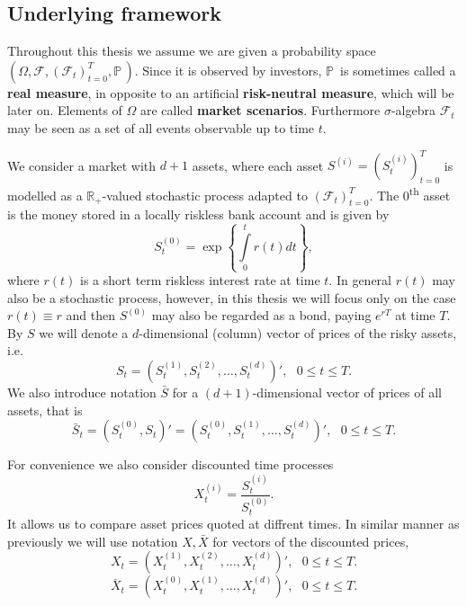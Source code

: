 \documentclass[a4paper,11pt, twoside]{book}
\theoremstyle{definition}
\theoremstyle{remark}
\def\P{{\mathbb{P}}\,}
\def\R{{\mathbb{R}}}
\def\Sa{\bar{S}}
\def\Xa{\bar{X}}
\begin{document}
\subsection{Underlying framework}
Throughout this thesis we assume we are given a probability space $(\Omega, \mathcal{F}, (\mathcal{F}_t)_{t=0}^T, \P)$. Since it is observed by investors, $\P$ is sometimes called a \textbf{real measure}, in opposite to an artificial \textbf{risk-neutral measure}, which will be later on. Elements of $\Omega$ are called \textbf{market scenarios}.
Furthermore $\sigma$-algebra $\mathcal{F}_t$ may be seen as a set of all events observable up to time $t$.

We consider a market with $d+1$ assets, where each asset $S^{(i)} = (S^{(i)}_t)_{t=0}^T$ is modelled as a $\R_+$-valued stochastic process adapted to $(\mathcal{F}_t)_{t=0}^T$. The $0$\textsuperscript{th} asset is the money stored in a locally riskless bank account and is given by 
\[S^{(0)}_t = \exp\left\{ \int\limits_0^t r(t)dt \right\},\]
where $r(t)$ is a short term riskless interest rate at time $t$. In general $r(t)$ may also be a stochastic process, however, in this thesis we will focus only on the case $r(t) \equiv r$ and then $S^{(0)}$ may also be regarded as a bond, paying $e^{rT}$ at time $T$. By $S$ we will denote a $d$-dimensional (column) vector of prices of the risky assets, i.e.
\begin{equation*}
 S_t = (S^{(1)}_t, S^{(2)}_t, \ldots, S^{(d)}_t)', \ \ \ 0 \leq t \leq T.
\end{equation*}
We also introduce notation $\Sa$ for a $(d+1)$-dimensional vector of prices of all assets, that is
\begin{equation*}
 \Sa_t = (S^{(0)}_t, S_t)' = (S^{(0)}_t, S^{(1)}_t, \ldots, S^{(d)}_t)', \ \ \ 0 \leq t \leq T.
\end{equation*}

For convenience we also consider discounted time processes
\[ X^{(i)}_t = \frac{S^{(i)}_t}{S^{(0)}_t}. \]
It allows us to compare asset prices quoted at diffrent times. In similar manner as previously we will use notation $X, \Xa$ for vectors of the discounted prices,
\begin{equation*}
 X_t = (X^{(1)}_t, X^{(2)}_t, \ldots, X^{(d)}_t)', \ \ \ 0 \leq t \leq T.
\end{equation*}
\begin{equation*}
 \Xa_t = (X^{(0)}_t, X^{(1)}_t, \ldots, X^{(d)}_t)', \ \ \ 0 \leq t \leq T.
\end{equation*}
\end{document}
